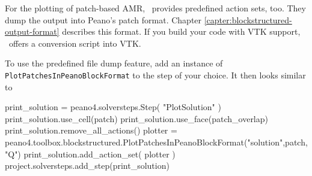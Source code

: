 For the plotting of patch-based AMR, \Peano\ provides predefined action sets,
too.
They dump the output into Peano's patch format.
Chapter \ref{capter:blockstructured-output-format} describes this format. 
If you build your code with VTK support, \Peano\ offers a conversion script into
VTK.



To use the predefined file dump feature, add an instance of
\texttt{PlotPatchesInPeanoBlockFormat} to the step of your choice. 
It then looks similar to
\begin{code}
print_solution = peano4.solversteps.Step( "PlotSolution" )
print_solution.use_cell(patch)
print_solution.use_face(patch_overlap)
print_solution.remove_all_actions()
plotter = peano4.toolbox.blockstructured.PlotPatchesInPeanoBlockFormat("solution",patch,"Q")
print_solution.add_action_set( plotter )
project.solversteps.add_step(print_solution)
\end{code}





